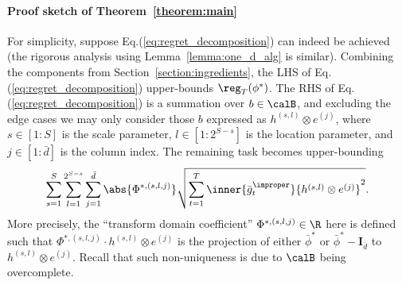 \documentclass[10pt]{article}
\begin{document}
\paragraph{Proof sketch of Theorem~\ref{theorem:main}} For simplicity, suppose Eq.(\ref{eq:regret_decomposition}) can indeed be achieved (the rigorous analysis using Lemma~\ref{lemma:one_d_alg} is similar). Combining the components from Section~\ref{section:ingredients}, the LHS of Eq.(\ref{eq:regret_decomposition}) upper-bounds $\reg_T(\phi^*)$. The RHS of Eq.(\ref{eq:regret_decomposition}) is a summation over $b\in\calB$, and excluding the edge cases we may only consider those $b$ expressed as $h^{(s,l)}\otimes e^{(j)}$, where $s\in[1:S]$ is the scale parameter, $l\in[1:2^{S-s}]$ is the location parameter, and $j\in[1:\bar d]$ is the column index. The remaining task becomes upper-bounding
\begin{equation}\label{eq:sketch}
\sum_{s=1}^S\sum_{l=1}^{2^{S-s}}\sum_{j=1}^{\bar d}\abs{\Phi^{*,(s,l,j)}}\sqrt{\sum_{t=1}^T\inner{\bar g_t^\improper}{h^{(s,l)}\otimes e^{(j)}}^2}.
\end{equation}
More precisely, the ``transform domain coefficient'' $\Phi^{*,(s,l,j)}\in\R$ here is defined such that $\Phi^{*,(s,l,j)}\cdot h^{(s,l)}\otimes e^{(j)}$ is the projection of either $\bar\phi^*$ or $\bar\phi^*-\bm{I}_{\bar d}$ to $h^{(s,l)}\otimes e^{(j)}$. Recall that such non-uniqueness is due to $\calB$ being overcomplete. 
\end{document}

